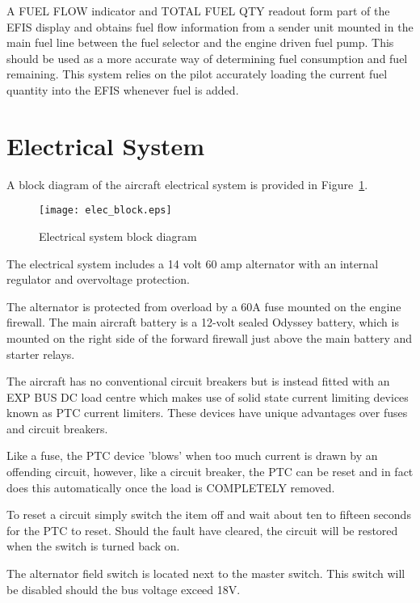 A FUEL FLOW indicator and TOTAL FUEL QTY readout form part of the EFIS display and obtains fuel flow information
from a sender unit mounted in the main fuel line between the fuel selector and the engine driven fuel pump. This
should be used as a more accurate way of determining fuel consumption and fuel remaining. This system relies
on the pilot accurately loading the current fuel quantity into the EFIS whenever fuel is added.

\section{Electrical System}
A block diagram of the aircraft electrical system is provided in Figure~\ref{fig:electrical}.

\begin{sidewaysfigure}
\begin{figure}[H]
\centering
\texttt{[image: elec\_block.eps]}
\caption{Electrical system block diagram}
\label{fig:electrical}
\end{figure}
\end{sidewaysfigure}

The electrical system includes a 14 volt 60 amp alternator with an internal regulator and overvoltage protection.

The alternator is protected from overload by a 60A fuse mounted on the engine firewall. The main aircraft battery
is a 12-volt sealed Odyssey battery, which is mounted on the right side of the forward firewall just above the
main battery and starter relays.

The aircraft has no conventional circuit breakers but is instead fitted with an EXP BUS DC load centre which
makes use of solid state current limiting devices known as PTC current limiters. These devices have unique
advantages over fuses and circuit breakers. 

Like a fuse, the PTC device 'blows' when too much current is drawn by an offending circuit, however, like a circuit breaker, the PTC can be reset and in fact does this automatically once the load is COMPLETELY removed.

To reset a circuit simply switch the item off and wait about ten to fifteen seconds for the PTC to reset. Should the
fault have cleared, the circuit will be restored when the switch is turned back on.

The alternator field switch is located next to the master switch. This switch will be disabled should the bus voltage exceed 18V.

